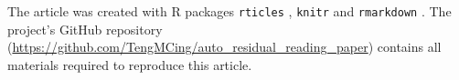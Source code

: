 \documentclass[]{interact}
\theoremstyle{plain}%
\theoremstyle{definition}
\theoremstyle{remark}
\begin{document}
The article was created with R packages \texttt{rticles}
\citep{rticles}, \texttt{knitr} \citep{knitr} and \texttt{rmarkdown}
\citep{rmarkdown}. The project's GitHub repository
(\url{https://github.com/TengMCing/auto_residual_reading_paper})
contains all materials required to reproduce this article.



\end{document}
